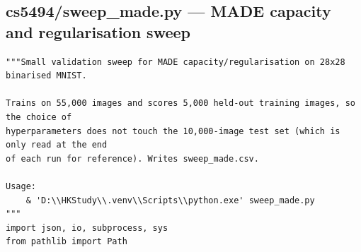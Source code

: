 \subsection*{cs5494/sweep\_made.py --- MADE capacity and regularisation sweep}
\begin{lstlisting}
"""Small validation sweep for MADE capacity/regularisation on 28x28 binarised MNIST.

Trains on 55,000 images and scores 5,000 held-out training images, so the choice of
hyperparameters does not touch the 10,000-image test set (which is only read at the end
of each run for reference). Writes sweep_made.csv.

Usage:
    & 'D:\\HKStudy\\.venv\\Scripts\\python.exe' sweep_made.py
"""
import json, io, subprocess, sys
from pathlib import Path


\end{lstlisting}
